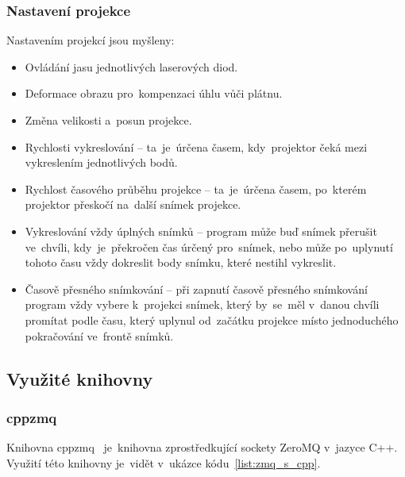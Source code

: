 \subsubsection{Nastavení projekce}
Nastavením projekcí jsou myšleny:
\begin{itemize}
\item Ovládání jasu jednotlivých laserových diod.
\item Deformace obrazu pro~kompenzaci úhlu vůči plátnu.
\item Změna velikosti a~posun projekce. 
\item Rychlosti vykreslování -- ta~je~úrčena časem, kdy~projektor čeká mezi vykreslením jednotlivých bodů.
\item Rychlost časového průběhu projekce -- ta~je~úrčena časem, po~kterém projektor přeskočí na~další snímek projekce.
\item Vykreslování vždy úplných snímků -- program může buď snímek přerušit ve~chvíli, kdy~je~překročen čas úrčený pro~snímek, nebo může po~uplynutí tohoto času vždy dokreslit body snímku, které nestihl vykreslit.
\item Časově přesného snímkování -- při zapnutí časově přesného snímkování program vždy vybere k~projekci snímek, který by~se~měl v~danou chvíli promítat podle času, který uplynul od~začátku projekce místo jednoduchého pokračování ve~frontě snímků.
\end{itemize}



\subsection{Využité knihovny}
\subsubsection{cppzmq}\label{sec:ls_cppzmq}
Knihovna cppzmq~\cite{cppzmq} je~knihovna zprostředkující sockety ZeroMQ v~jazyce C++. Využití této knihovny je~vidět v~ukázce kódu~\ref{list:zmq_s_cpp}.
\begin{code}
  \inputminted[frame=lines,fontsize=\footnotesize{}, linenos, breaklines]{cpp}{code_examples/zmq_server.cpp}
\end{code}

